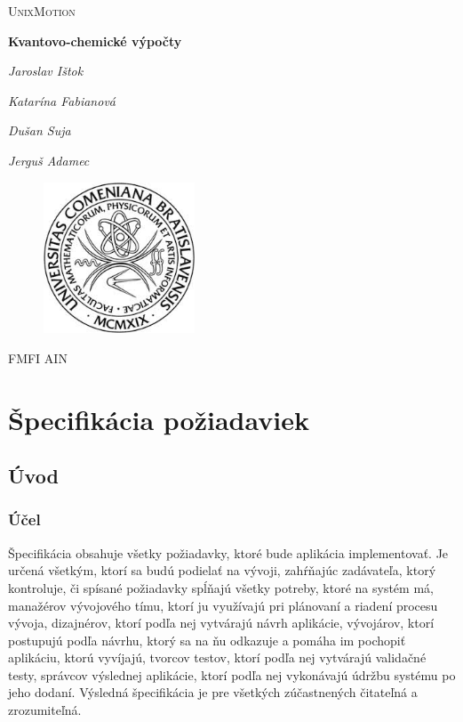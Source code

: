 \documentclass[12pt,a4paper]{article}
\begin{document}
	
\begin{titlepage}
	\centering
	\vspace{1cm}
	{\scshape\LARGE UnixMotion} \par
	\vspace{1cm}
	{\huge\bfseries Kvantovo-chemické výpočty} \par
	\vspace{2cm}
	{\Large\itshape Jaroslav Ištok \par}
	{\Large\itshape Katarína Fabianová \par}
	{\Large\itshape Dušan Suja \par}
	{\Large\itshape Jerguš Adamec \par}
	\vfill
	\begin{figure}[H]
		\centering
		\includegraphics[width=0.4\textwidth]{fmfi}
	\end{figure}
	\vspace{2cm}
	{\large FMFI AIN}
\end{titlepage}

\pagebreak

\tableofcontents
\vspace{2cm}
\listoffigures

\pagebreak

\section{Špecifikácia požiadaviek}

\subsection{Úvod}

\subsubsection{Účel}
Špecifikácia obsahuje všetky požiadavky, ktoré bude aplikácia implementovať. Je určená všetkým, ktorí sa budú podielať na vývoji, zahŕňajúc zadávateľa, ktorý kontroluje, či spísané požiadavky spĺňajú všetky potreby, ktoré na systém má, manažérov vývojového tímu, ktorí ju využívajú pri plánovaní a riadení procesu vývoja, dizajnérov, ktorí podľa nej vytvárajú návrh aplikácie, vývojárov, ktorí postupujú podľa návrhu, ktorý sa na ňu odkazuje a pomáha im pochopiť aplikáciu, ktorú vyvíjajú, tvorcov testov, ktorí podľa nej vytvárajú validačné testy, správcov výslednej aplikácie, ktorí podľa nej vykonávajú údržbu systému po jeho dodaní. Výsledná špecifikácia je pre všetkých zúčastnených čitateľná a zrozumiteľná.
\end{document}
